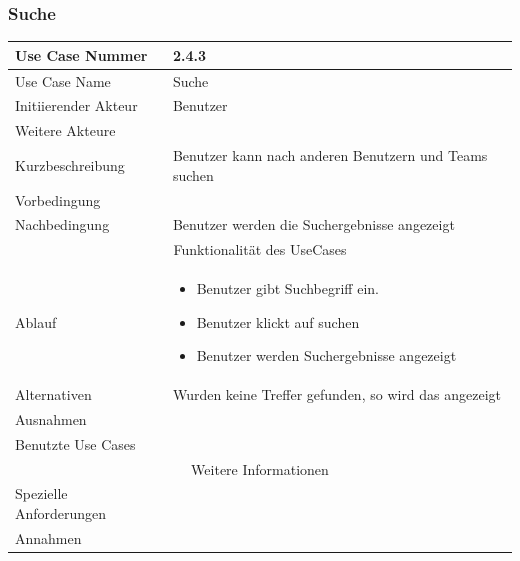 \documentclass[10pt,a4paper]{article}
\begin{document}
\subsubsection{Suche}
		\begin{tabular}{|l|p{.5\linewidth}|}
		\hline Use Case Nummer & 2.4.3 \\ 
		\hline Use Case Name & Suche \\ 
		\hline Initiierender Akteur & Benutzer \\
		\hline Weitere Akteure &  \\
		\hline Kurzbeschreibung & Benutzer kann nach anderen Benutzern und Teams suchen \\
		\hline Vorbedingung &  \\
		\hline Nachbedingung & Benutzer werden die Suchergebnisse angezeigt \\
		\hline \multicolumn{2}{|c|}{Funktionalität des UseCases}\\
		\hline Ablauf & \begin{itemize}
			\item Benutzer gibt Suchbegriff ein.
			\item Benutzer klickt auf suchen
			\item Benutzer werden Suchergebnisse angezeigt
		\end{itemize} \\
		\hline Alternativen & Wurden keine Treffer gefunden, so wird das angezeigt \\
		\hline Ausnahmen &  \\
		\hline Benutzte Use Cases &  \\
		\hline \multicolumn{2}{|c|}{Weitere Informationen} \\
		\hline Spezielle Anforderungen &  \\
		\hline Annahmen &  \\
		\hline
		\end{tabular}
\end{document}

